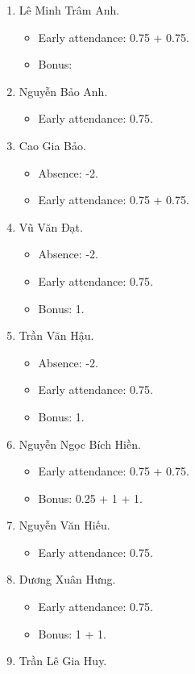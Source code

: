 \documentclass{article}
\begin{document}
\begin{enumerate}
	\item {\sc Lê Minh Trâm Anh.}
	\begin{itemize}
		\item Early attendance: 0.75 + 0.75.
		\item Bonus: 
	\end{itemize}
	\item {\sc Nguyễn Bảo Anh.}
	\begin{itemize}
		\item Early attendance: 0.75.
	\end{itemize}
	\item {\sc Cao Gia Bảo.}
	\begin{itemize}
		\item Absence: -2.
		\item Early attendance: 0.75 + 0.75.
	\end{itemize}
	\item {\sc Vũ Văn Đạt.}
	\begin{itemize}
		\item Absence: -2.
		\item Early attendance: 0.75.
		\item Bonus: 1.
	\end{itemize}
	\item {\sc Trần Văn Hậu.}
	\begin{itemize}
		\item Absence: -2.
		\item Early attendance: 0.75.
		\item Bonus: 1.
	\end{itemize}
	\item {\sc Nguyễn Ngọc Bích Hiền.}
	\begin{itemize}
		\item Early attendance: 0.75 + 0.75.
		\item Bonus: 0.25 + 1 + 1.
	\end{itemize}
	\item {\sc Nguyễn Văn Hiếu.}
	\begin{itemize}
		\item Early attendance: 0.75.
	\end{itemize}
	\item {\sc Dương Xuân Hưng.}
	\begin{itemize}
		\item Early attendance: 0.75.
		\item Bonus: 1 + 1.
	\end{itemize}
	\item {\sc Trần Lê Gia Huy.}

\end{enumerate}
\end{document}
